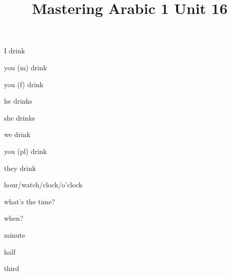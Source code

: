 \documentclass[avery5371,grid,frame]{flashcards}
\title{Mastering Arabic 1 Unit 16}
\begin{document}
\begin{flashcard}{\LARGE I drink}
\LARGE {}
\end{flashcard}
\begin{flashcard}{\LARGE you (m) drink}
\LARGE {}
\end{flashcard}
\begin{flashcard}{\LARGE you (f) drink}
\LARGE {}
\end{flashcard}
\begin{flashcard}{\LARGE he drinks}
\LARGE {}
\end{flashcard}
\begin{flashcard}{\LARGE she drinks}
\LARGE {}
\end{flashcard}
\begin{flashcard}{\LARGE we drink}
\LARGE {}
\end{flashcard}
\begin{flashcard}{\LARGE you (pl) drink}
\LARGE {}
\end{flashcard}
\begin{flashcard}{\LARGE they drink}
\LARGE {}
\end{flashcard}
\begin{flashcard}{\LARGE hour/watch/clock/o'clock}
\LARGE {}
\end{flashcard}
\begin{flashcard}{\LARGE what's the time?}
\LARGE {}
\end{flashcard}
\begin{flashcard}{\LARGE when?}
\LARGE {}
\end{flashcard}
\begin{flashcard}{\LARGE minute}
\LARGE {}
\end{flashcard}
\begin{flashcard}{\LARGE half}
\LARGE {}
\end{flashcard}
\begin{flashcard}{\LARGE third}
\LARGE {}
\end{flashcard}
\end{document}
